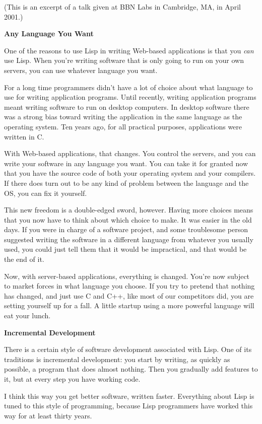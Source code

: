 (This is an excerpt of a talk given at BBN Labs in Cambridge, MA, in
April 2001.)

\textbf{Any Language You Want}

One of the reasons to use Lisp in writing Web-based applications is that
you \emph{can} use Lisp. When you're writing software that is only going
to run on your own servers, you can use whatever language you want.

For a long time programmers didn't have a lot of choice about what
language to use for writing application programs. Until recently,
writing application programs meant writing software to run on desktop
computers. In desktop software there was a strong bias toward writing
the application in the same language as the operating system. Ten years
ago, for all practical purposes, applications were written in C.

With Web-based applications, that changes. You control the servers, and
you can write your software in any language you want. You can take it
for granted now that you have the source code of both your operating
system and your compilers. If there does turn out to be any kind of
problem between the language and the OS, you can fix it yourself.

This new freedom is a double-edged sword, however. Having more choices
means that you now have to think about which choice to make. It was
easier in the old days. If you were in charge of a software project, and
some troublesome person suggested writing the software in a different
language from whatever you usually used, you could just tell them that
it would be impractical, and that would be the end of it.

Now, with server-based applications, everything is changed. You're now
subject to market forces in what language you choose. If you try to
pretend that nothing has changed, and just use C and C++, like most of
our competitors did, you are setting yourself up for a fall. A little
startup using a more powerful language will eat your lunch.

\textbf{Incremental Development}

There is a certain style of software development associated with Lisp.
One of its traditions is incremental development: you start by writing,
as quickly as possible, a program that does almost nothing. Then you
gradually add features to it, but at every step you have working code.

I think this way you get better software, written faster. Everything
about Lisp is tuned to this style of programming, because Lisp
programmers have worked this way for at least thirty years.

